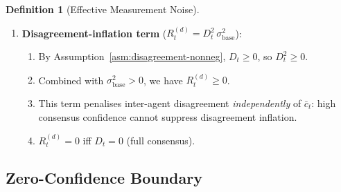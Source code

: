 \documentclass[12pt,openany]{book}
\numberwithin{equation}{chapter}
\theoremstyle{plain}
\theoremstyle{definition}
\newtheorem{definition}[theorem]{Definition}
\theoremstyle{remark}
\begin{document}
\begin{definition}[Effective Measurement Noise]
\begin{enumerate}
  \item \textbf{Disagreement-inflation term}
        ($R_t^{(d)} = D_t^2\,\sigma_{\mathrm{base}}^2$):
        \begin{enumerate}
          \item By Assumption~\ref{asm:disagreement-nonneg},
                $D_t \geq 0$, so $D_t^2 \geq 0$.
          \item Combined with $\sigma_{\mathrm{base}}^2 > 0$,
                we have $R_t^{(d)} \geq 0$.
          \item This term penalises inter-agent disagreement
                \emph{independently} of $\bar{c}_t$: high
                consensus confidence cannot suppress disagreement
                inflation.
          \item $R_t^{(d)} = 0$ iff $D_t = 0$ (full consensus).
        \end{enumerate}
\end{enumerate}
\end{definition}

\subsection{Zero-Confidence Boundary}
\end{document}

